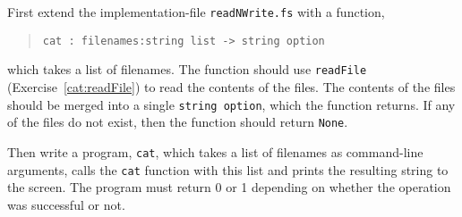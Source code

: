 First extend the implementation-file \lstinline{readNWrite.fs} with a function,
\begin{quote}
  \mbox{\lstinline!cat : filenames:string list -> string option!}
\end{quote}
which takes a list of filenames. The function should use
\lstinline{readFile} (Exercise~\ref{cat:readFile}) to read the
contents of the files. The contents of the files should be merged into
a single \lstinline{string option}, which the function returns. If any of the
files do not exist, then the function should return \lstinline{None}.

Then write a program, \lstinline[language=console]{cat}, which takes a
list of filenames as command-line arguments, calls the \lstinline{cat}
function with this list and prints the resulting string to the screen. The
program must return 0 or 1 depending on whether the operation was
successful or not.